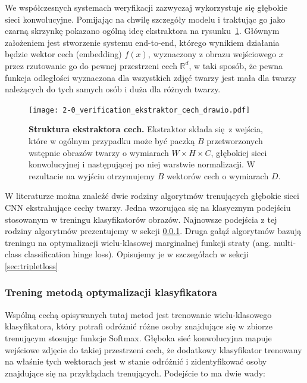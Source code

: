 We współczesnych systemach weryfikacji zazwyczaj wykorzystuje się głębokie sieci konwolucyjne.
Pomijając na chwilę szczegóły modelu i traktując go jako czarną skrzynkę pokazano ogólną ideę
ekstraktora na rysunku~\ref{fig:ekstraktor_cech}. Głównym założeniem jest stworzenie systemu
end-to-end, którego wynikiem działania będzie wektor cech (embedding) \(f(x)\), wyznaczony z obrazu
wejściowego \(x\) przez rzutowanie go do pewnej przestrzeni cech \(\mathbb{R}^d\), w taki sposób,
że pewna funkcja odległości wyznaczona dla wszystkich zdjęć twarzy jest mała dla twarzy
należących do tych samych osób i duża dla różnych twarzy.
\begin{figure}[h]
    \centering
    \texttt{[image: 2-0\_verification\_ekstraktor\_cech\_drawio.pdf]}
    \caption{\textbf{Struktura ekstraktora cech.} Ekstraktor składa się z wejścia, które w ogólnym przypadku może być paczką \(B\) przetworzonych wstępnie obrazów twarzy o wymiarach \( W \times H \times C\), głębokiej sieci konwolucyjnej i następującej po niej warstwie normalizacji. W rezultacie na wyjściu otrzymujemy \(B\) wektorów cech o wymiarach \(D\).}
    \label{fig:ekstraktor_cech}
\end{figure}


W literaturze można znaleźć dwie rodziny algorytmów trenujących głębokie sieci CNN ekstrahujące
cechy twarzy. Jedna wzorująca się na klasycznym podejściu stosowanym w treningu klasyfikatorów
obrazów. Najnowsze podejścia z tej rodziny algorytmów prezentujemy w sekcji
\ref{sec:klasyfikatory}. Druga gałąź algorytmów bazują treningu na optymalizacji wielu-klasowej
marginalnej funkcji straty (ang. multi-class classification hinge loss). Opisujemy je w
szczegółach w sekcji \ref{sec:tripletloss}

\subsubsection{Trening metodą optymalizacji klasyfikatora}\label{sec:klasyfikatory}

Wspólną cechą opisywanych tutaj metod jest trenowanie wielu-klasowego klasyfikatora, który
potrafi odróżnić różne osoby znajdujące się w zbiorze trenującym stosując funkcje Softmax. Głęboka sieć konwolucyjna mapuje wejściowe zdjęcie do takiej przestrzeni cech, że dodatkowy klasyfikator
trenowany na właśnie tych wektorach jest w stanie odróżnić i zidentyfikować osoby znajdujące się
na przykłądach trenujących. Podejście to ma dwie wady:

